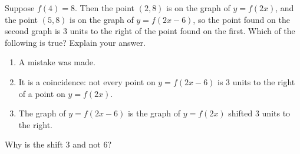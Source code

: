 Suppose $f(4)=8$. Then the point $(2,8)$ is on the graph of $y=f(2x)$, and the point $(5,8)$ is on the graph of $y=f(2x-6)$, so the point found on the second graph is $3$ units to the right of the point found on the first. Which of the following is true? Explain your answer.
\begin{enumerate}
\item[(a)] A mistake was made.
\item[(b)] It is a coincidence: not every point on $y=f(2x-6)$ is $3$ units to the right of a point on $y=f(2x)$.
\item[(c)] The graph of $y=f(2x-6)$ is the graph of $y=f(2x)$ shifted $3$ units to the right.
\end{enumerate}
Why is the shift $3$ and not $6$?
